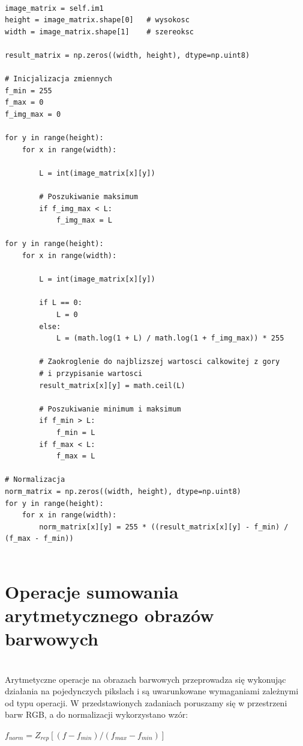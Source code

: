 \documentclass[final,a4paper,openany,12pt]{mwbk}
\begin{document}
\begin{lstlisting}[caption=Logarytmowanie obrazu szarego]

image_matrix = self.im1
height = image_matrix.shape[0]   # wysokosc
width = image_matrix.shape[1]    # szereoksc

result_matrix = np.zeros((width, height), dtype=np.uint8)

# Inicjalizacja zmiennych
f_min = 255
f_max = 0
f_img_max = 0

for y in range(height):
    for x in range(width):  

        L = int(image_matrix[x][y]) 

        # Poszukiwanie maksimum
        if f_img_max < L:
            f_img_max = L

for y in range(height):
    for x in range(width):  

        L = int(image_matrix[x][y]) 

        if L == 0:
            L = 0
        else:
            L = (math.log(1 + L) / math.log(1 + f_img_max)) * 255

        # Zaokroglenie do najblizszej wartosci calkowitej z gory
        # i przypisanie wartosci
        result_matrix[x][y] = math.ceil(L)

        # Poszukiwanie minimum i maksimum
        if f_min > L:
            f_min = L
        if f_max < L:
            f_max = L

# Normalizacja
norm_matrix = np.zeros((width, height), dtype=np.uint8)
for y in range(height):
    for x in range(width):
        norm_matrix[x][y] = 255 * ((result_matrix[x][y] - f_min) / (f_max - f_min))


\end{lstlisting}
\newpage

\chapter{Operacje sumowania arytmetycznego obrazów barwowych}
\hfill\\
\indent
Arytmetyczne operacje na obrazach barwowych przeprowadza się wykonując działania na pojedynczych pikslach i są uwarunkowane wymaganiami zależnymi od typu operacji. 
W przedstawionych zadaniach poruszamy się w przestrzeni barw RGB, a do normalizacji wykorzystano wzór:

	\begin{center}
		$ f_{norm} = Z_{rep}[(f - f_{min}) / (f_{max} - f_{min})] $
	\end{center}
\end{document}
